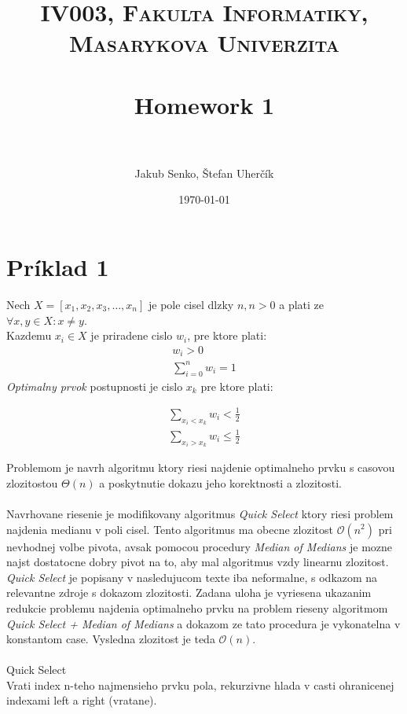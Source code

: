 \documentclass[paper=a4, fontsize=11pt]{scrartcl} %
\title{	
\normalfont \normalsize 
\textsc{IV003, Fakulta Informatiky, Masarykova Univerzita} \\ [25pt] %
\horrule{0.5pt} \\[0.4cm] %
\huge Homework 1 \\ %
\horrule{2pt} \\[0.5cm] %
}
\author{Jakub Senko, Štefan Uherčík} %
\date{\normalsize\today} %
\numberwithin{equation}{section} %
\numberwithin{figure}{section} %
\numberwithin{table}{section} %
\begin{document}
\maketitle %


\section*{Príklad 1}

Nech $X = [x_1, x_2, x_3, \dots, x_n]$ je pole cisel dlzky $n, n > 0$ a plati ze $\forall x,y \in X: x \neq y$. \\
Kazdemu $x_i \in X$ je priradene cislo $w_i$, pre ktore plati:
\begin{equation}
    \begin{aligned}
        w_i > 0 \\
        \sum_{i = 0}^{n} w_i = 1
    \end{aligned}
\end{equation}
{\em Optimalny prvok} postupnosti je cislo $x_k$ pre ktore plati:

\begin{equation}
    \begin{aligned}
        \sum_{x_i < x_k} w_i < \frac{1}{2} \\
        \sum_{x_i > x_k} w_i \leq \frac{1}{2}
    \end{aligned}
\end{equation}

Problemom je navrh algoritmu ktory riesi najdenie optimalneho prvku s casovou zlozitostou $\Theta(n)$ a poskytnutie dokazu jeho korektnosti a zlozitosti. \\
\\
Navrhovane riesenie je modifikovany algoritmus {\em Quick Select} ktory riesi problem najdenia medianu v poli cisel. Tento algoritmus ma obecne zlozitost $\mathcal{O}(n^2)$ pri nevhodnej volbe pivota, avsak pomocou procedury {\em Median of Medians} je mozne najst dostatocne dobry pivot na to, aby mal algoritmus vzdy linearnu zlozitost.  {\em Quick Select} je popisany v nasledujucom texte iba neformalne, s odkazom na relevantne zdroje s dokazom zlozitosti. Zadana uloha  je vyriesena ukazanim redukcie problemu najdenia optimalneho prvku na problem rieseny algoritmom {\em Quick Select + Median of Medians} \cite{blum} a dokazom ze tato procedura je vykonatelna v konstantom case. Vysledna zlozitost je teda $\mathcal{O}(n)$. \\
\\
Quick Select \\
Vrati index n-teho najmensieho prvku pola, rekurzivne hlada v casti ohranicenej indexami left a right (vratane).
\end{document}
